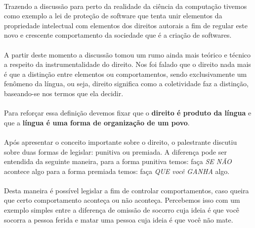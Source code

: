 \documentclass[12pt]{article}
\begin{document}
	\paragraph{}
		Trazendo a discussão para perto da realidade da ciência da computação
		tivemos como exemplo a lei de proteção de software que tenta
		unir elementos da propriedade intelectual com elementos dos
		direitos autorais a fim de regular este novo e crescente comportamento
		da sociedade que é a criação de softwares.
	\paragraph{}
		A partir deste momento a discussão tomou um rumo ainda mais teórico e
		técnico a respeito da instrumentalidade do direito. Nos foi falado que
		o direito nada mais é que a distinção entre elementos ou comportamentos,
		sendo exclusivamente um fenômeno da língua, ou seja, direito significa
		como a coletividade faz a distinção, baseando-se nos termos que ela 
		decidir.
	\paragraph{}
		Para reforçar essa definição devemos fixar que o \textbf{direito é
		produto da língua} e que a \textbf{língua é uma forma de organização de 
		um povo}.
	\paragraph{}
		Após apresentar o conceito importante sobre o direito, o palestrante
		discutiu sobre duas formas de legislar: punitiva ou premiada. A
		diferença pode ser entendida da seguinte maneira, para a forma
		punitiva temos: faça \textit{SE NÃO} acontece algo 	
		para a forma premiada temos: faça \textit{QUE você GANHA} algo.
	\paragraph{}
		Desta maneira é possível	legislar a fim de controlar comportamentos,
		caso queira que certo comportamento aconteça ou não aconteça.
		Percebemos isso com um exemplo simples entre a diferença de omissão de
		socorro cuja ideia é que você socorra a pessoa ferida e matar uma pessoa
		cuja ideia é que você não mate.
\end{document}
